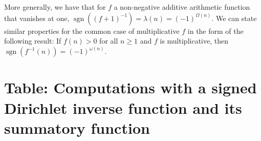\documentclass[11pt,reqno,a4letter]{article}
\numberwithin{figure}{section}
\numberwithin{table}{section}
\theoremstyle{plain}
\numberwithin{theorem}{section}
\theoremstyle{definition}
\begin{document}
More generally, we have that for $f$ a non-negative additive arithmetic function that vanishes at one, 
$\operatorname{sgn}((f+1)^{-1}) = \lambda(n) = (-1)^{\Omega(n)}$. 
We can state similar properties for the common case of multiplicative $f$ in the 
form of the following result: If $f(n) > 0$ for all $n \geq 1$ and $f$ is multiplicative, then 
$\operatorname{sgn}(f^{-1}(n)) = (-1)^{\omega(n)}$. 

\newpage 
\renewcommand{\refname}{References} 
{}


\newpage
\setcounter{section}{0} 
\renewcommand{\thesection}{T.\arabic{section}} 

\newpage
\section{Table: Computations with a signed Dirichlet inverse function and its summatory function} 
\label{table_conjecture_Mertens_ginvSeq_approx_values}
\end{document}
